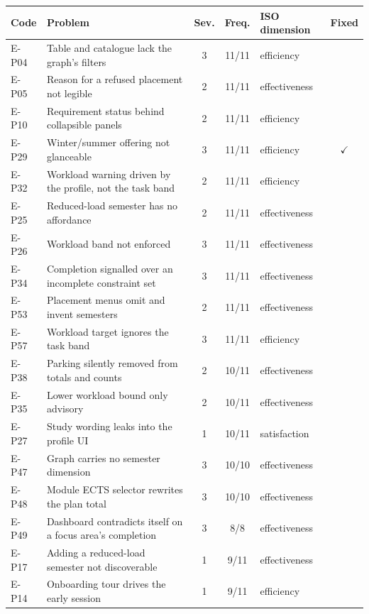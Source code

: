 \begin{table}[htpb]
    \centering
    \small
    \begin{tabular}{@{}l>{\raggedright\arraybackslash}p{7.0cm}ccl c@{}}
        \toprule
        Code & Problem & Sev. & Freq. & ISO dimension & Fixed \\
        \midrule
        E-P04 & Table and catalogue lack the graph's filters & 3 & 11/11 & efficiency & \\
        E-P05 & Reason for a refused placement not legible & 2 & 11/11 & effectiveness & \\
        E-P10 & Requirement status behind collapsible panels & 2 & 11/11 & efficiency & \\
        E-P29 & Winter/summer offering not glanceable & 3 & 11/11 & efficiency & $\checkmark$ \\
        E-P32 & Workload warning driven by the profile, not the task band & 2 & 11/11 & efficiency & \\
        E-P25 & Reduced-load semester has no affordance & 2 & 11/11 & effectiveness & \\
        E-P26 & Workload band not enforced & 3 & 11/11 & effectiveness & \\
        E-P34 & Completion signalled over an incomplete constraint set & 3 & 11/11 & effectiveness & \\
        E-P53 & Placement menus omit and invent semesters & 2 & 11/11 & effectiveness & \\
        E-P57 & Workload target ignores the task band & 3 & 11/11 & efficiency & \\
        E-P38 & Parking silently removed from totals and counts & 2 & 10/11 & effectiveness & \\
        E-P35 & Lower workload bound only advisory & 2 & 10/11 & effectiveness & \\
        E-P27 & Study wording leaks into the profile UI & 1 & 10/11 & satisfaction & \\
        E-P47 & Graph carries no semester dimension & 3 & 10/10 & effectiveness & \\
        E-P48 & Module ECTS selector rewrites the plan total & 3 & 10/10 & effectiveness & \\
        E-P49 & Dashboard contradicts itself on a focus area's completion & 3 & 8/8 & effectiveness & \\
        E-P17 & Adding a reduced-load semester not discoverable & 1 & 9/11 & effectiveness & \\
        E-P14 & Onboarding tour drives the early session & 1 & 9/11 & efficiency & \\

\end{tabular}
\end{table}
